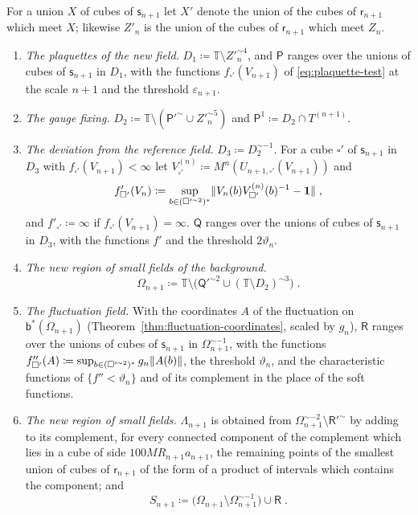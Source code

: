 \documentclass[11pt]{preprint}
\newcommand{\id}{\mathbf 1}
\DeclarePairedDelimiter{\norm}{\lVert}{\rVert}
\numberwithin{equation}{section}
\begin{document}
\begin{definition}\label{def:step-regions}
For a union $X$ of cubes of $\mathsf s_{n+1}$ let $X'$ denote the union of the cubes of $\mathsf r_{n+1}$ which meet $X$; likewise $Z'_n$ is the union of the cubes of $\mathsf r_{n+1}$ which meet $Z_n$.
\begin{enumerate}[label=(\roman*)]
\item \emph{The plaquettes of the new field.} $D_1 \coloneqq \mathbb T \setminus Z'^{\sim4}_n$, and $\mathsf P$ ranges over the unions of cubes of $\mathsf s_{n+1}$ in $D_1$, with the functions $f_{\square'}(V_{n+1})$ of \eqref{eq:plaquette-test} at the scale $n + 1$ and the threshold $\varepsilon_{n+1}$.
\item \emph{The gauge fixing.} $D_2 \coloneqq \mathbb T \setminus (\mathsf P'^\sim \cup Z'^{\sim5}_n)$ and $\mathsf P^1 \coloneqq D_2 \cap T^{(n+1)}$.
\item \emph{The deviation from the reference field.} $D_3 \coloneqq D_2^{\sim-1}$. For a cube $\square'$ of $\mathsf s_{n+1}$ in $D_3$ with $f_{\square'}(V_{n+1}) < \infty$ let $V^{(n)}_{\square'} \coloneqq M^n(U_{n+1,\square'}(V_{n+1}))$ and
\begin{equation}\label{eq:deviation-test}
    f'_{\square'}(V_n) \coloneqq \sup_{b \in (\square'^{\sim2})^*}\norm{V_n(b)V^{(n)}_{\square'}(b)^{-1} - \id}\;,
\end{equation}
and $f'_{\square'} \coloneqq \infty$ if $f_{\square'}(V_{n+1}) = \infty$. $\mathsf Q$ ranges over the unions of cubes of $\mathsf s_{n+1}$ in $D_3$, with the functions $f'$ and the threshold $2\vartheta_n$.
\item \emph{The new region of small fields of the background.}
\begin{equation}\label{eq:new-omega}
    \Omega_{n+1} \coloneqq \mathbb T \setminus \bigl(\mathsf Q'^{\sim2} \cup (\mathbb T \setminus D_2)^{\sim3}\bigr)\;.
\end{equation}
\item \emph{The fluctuation field.} With the coordinates $A$ of the fluctuation on $\mathsf b^*(\Omega_{n+1})$ (Theorem~\ref{thm:fluctuation-coordinates}, scaled by $g_n$), $\mathsf R$ ranges over the unions of cubes of $\mathsf s_{n+1}$ in $\Omega^{\sim-1}_{n+1}$, with the functions $f''_{\square'}(A) \coloneqq \sup_{b \in (\square'^{\sim2})^*}g_n\norm{A(b)}$, the threshold $\vartheta_n$, and the characteristic functions of $\{ f'' < \vartheta_n \}$ and of its complement in the place of the soft functions.
\item \emph{The new region of small fields.} $\Lambda_{n+1}$ is obtained from $\Omega^{\sim-2}_{n+1} \setminus \mathsf R'^\sim$ by adding to its complement, for every connected component of the complement which lies in a cube of side $100MR_{n+1}a_{n+1}$, the remaining points of the smallest union of cubes of $\mathsf r_{n+1}$ of the form of a product of intervals which contains the component; and
\begin{equation}\label{eq:new-s}
    S_{n+1} \coloneqq \bigl(\Omega_{n+1} \setminus \Omega^{\sim-1}_{n+1}\bigr) \cup \mathsf R\;.
\end{equation}
\end{enumerate}
\end{definition}
\end{document}
